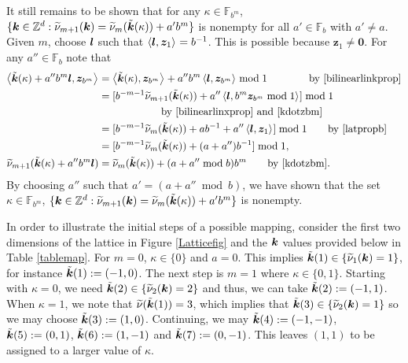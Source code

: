 \documentclass[graybox]{svmult}
\newcommand{\Z}{\mathbb{Z}} %
\newcommand{\F}{\mathbb{F}} %
\newcommand{\bszero}{\boldsymbol{0}} %
\newcommand{\bsz}{\boldsymbol{z}}    %
\begin{document}
It still remains to be shown that  for any $\kappa \in \F_{b^{m}}$, $\{\bsk \in  \Z^d : \tnu_{m+1}(\bsk)=\tnu_{m}(\tvk(\kappa))+a' b^m\}$ is nonempty for all $a' \in \F_b$ with $a' \ne a$.  Given $m$, choose $\boldsymbol{l}$ such that $\ip{\bsl}{\bsz_1}=b^{-1}$. This is possible because $\bsz_1 \ne \bszero$.  For any  $a'' \in \F_b$ note that
\begin{align*}
\ip{\tvk(\kappa) + a'' b^{m} \bsl}{\bsz_{b^{m}}}& = \ip{\tvk(\kappa)}{\bsz_{b^{m}}} + a'' b^m \ip{\bsl}{\bsz_{b^{m}}} \bmod 1 \qquad \qquad \text{by \eqref{bilinearlinkprop}} \\
&= [b^{-m-1}\tnu_{m+1}(\tvk(\kappa)) + a'' \ip{\bsl}{b^m  \bsz_{b^{m}}\bmod 1}] \bmod 1 \\
& \qquad \qquad \qquad  \text{by \eqref{bilinearlinxprop} and \eqref{kdotzbm}}\\
&= [b^{-m-1}\tnu_{m}(\tvk(\kappa)) + a b^{-1} + a'' \ip{\bsl}{\bsz_{1}}] \bmod 1 \qquad  \text{by \eqref{latpropb}}\\
&= [b^{-m-1}\tnu_{m}(\tvk(\kappa)) + (a+a'') b^{-1}] \bmod 1,\\
\tnu_{m+1}(\tvk(\kappa) + a'' b^{m} \bsl) & = 
\tnu_{m}(\tvk(\kappa)) + (a+a'' \bmod b) b^{m} \qquad \text{by \eqref{kdotzbm}}.
\end{align*}
By choosing $a''$ such that $a'=(a+a'' \bmod b)$, we have shown that the set $\kappa \in \F_{b^{m}}$, $\{\bsk \in  \Z^d : \tnu_{m+1}(\bsk)=\tnu_{m}(\tvk(\kappa))+a' b^m\}$ is nonempty.

In order to illustrate the initial steps of a possible mapping, consider the first two dimensions of the lattice in Figure \ref{Latticefig} and the $\boldsymbol{k}$ values provided below in Table \ref{tablemap}. For $m=0$, $\kappa\in\{0\}$ and $a=0$. This implies $\tilde{\boldsymbol{k}}(1)\in\{\widetilde{\nu}_{1}(\boldsymbol{k})=1\}$, for instance $\tilde{\boldsymbol{k}}(1):=(-1,0)$. The next step is $m=1$ where $\kappa\in\{0,1\}$. Starting with $\kappa=0$, we need $\tilde{\boldsymbol{k}}(2)\in\{\widetilde{\nu}_{2}(\boldsymbol{k})=2\}$ and thus, we can take $\tilde{\boldsymbol{k}}(2):=(-1,1)$. When $\kappa=1$, we note that $\widetilde{\nu}(\tilde{\boldsymbol{k}}(1))=3$, which implies that $\tilde{\boldsymbol{k}}(3)\in\{\widetilde{\nu}_{2}(\boldsymbol{k})=1\}$ so we may choose $\tilde{\boldsymbol{k}}(3):=(1,0)$. Continuing, we may  $\tilde{\boldsymbol{k}}(4):=(-1,-1)$, $\tilde{\boldsymbol{k}}(5):=(0,1)$, $\tilde{\boldsymbol{k}}(6):=(1,-1)$ and $\tilde{\boldsymbol{k}}(7):=(0,-1)$.  This leaves $(1,1)$ to be assigned to a larger value of $\kappa$.
\end{document}
